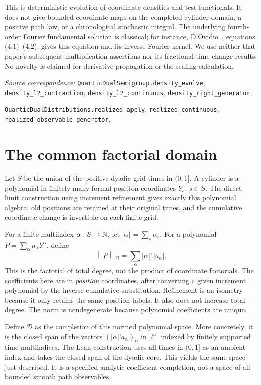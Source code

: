 \documentclass[11pt]{article}
\theoremstyle{remark}\newtheorem{remark}[theorem]{Remark}
\newcommand{\D}{\mathcal D}\newcommand{\E}{\mathcal E}
\newcommand{\norm}[1]{\left\lVert#1\right\rVert}
\newcommand{\code}[1]{{\small\nolinkurl{#1}}}
\begin{document}
This is deterministic evolution of coordinate densities and
test functionals. It does not give bounded coordinate maps on
the completed cylinder domain, a positive path law, or a
chronological stochastic integral. The underlying fourth-order
Fourier fundamental solution is classical; for instance,
D'Ovidio~\cite{dovidio}, equations (4.1)--(4.2), gives this
equation and its inverse Fourier kernel. We use neither that
paper's subsequent multiplication assertions nor its
fractional time-change results. No novelty is claimed for
derivative propagation or the scaling calculation.

\par\noindent\begingroup\small\raggedright
\textit{Source correspondence:}
\code{QuarticDualSemigroup.density_evolve},
\code{density_l2_contraction}, \code{density_l2_continuous},
\code{density_right_generator}.
\par\noindent
\code{QuarticDualDistributions.realized_apply},
\code{realized_continuous}, \code{realized_observable_generator}.
\par\endgroup

\section{The common factorial domain}\label{sec:domain}
Let $S$ be the union of the positive dyadic grid times in $(0,1]$.
A cylinder is a polynomial in finitely many formal position
coordinates $Y_s$, $s\in S$. The direct-limit construction using
increment refinement gives exactly this polynomial algebra: old
positions are retained at their original times, and the cumulative
coordinate change is invertible on each finite grid.

For a finite multiindex $\alpha:S\to\mathbb N$, let
$|\alpha|=\sum_s\alpha_s$. For a polynomial
$P=\sum_\alpha a_\alpha Y^\alpha$, define
\begin{equation}\label{eq:norm}
 \norm P_{\D}=\sum_\alpha |\alpha|!\,|a_\alpha|.
\end{equation}
This is the factorial of total degree, not the product of coordinate
factorials. The coefficients here are in \emph{position} coordinates,
after converting a given increment polynomial by the inverse
cumulative substitution. Refinement is an isometry because it only
retains the same position labels. It also does not increase total
degree. The norm is nondegenerate because polynomial coefficients
are unique.

Define $\D$ as the completion of this normed polynomial space.
More concretely, it is the closed span of the vectors
$(|\alpha|!a_\alpha)_\alpha$ in $\ell^1$ indexed by finitely
supported time multiindices. The Lean construction uses all times
in $(0,1]$ as an ambient index and takes the closed span of the
dyadic core. This yields the same space just described. It is a
specified analytic coefficient completion, not a space of all
bounded smooth path observables.
\end{document}

